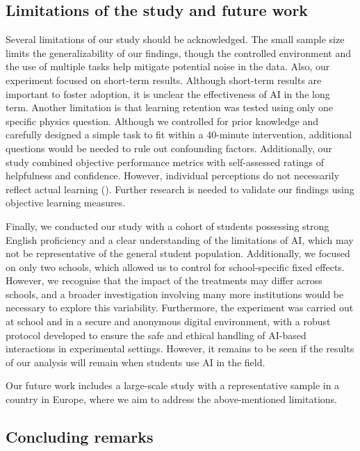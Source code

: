\documentclass[
  12pt,
]{article}
\begin{document}
\subsection{Limitations of the study and future work}\label{limitations-of-the-study-and-future-work}

Several limitations of our study should be acknowledged. The small sample size limits the generalizability of our findings, though the controlled environment and the use of multiple tasks help mitigate potential noise in the data. Also, our experiment focused on short-term results. Although short-term results are important to foster adoption, it is unclear the effectiveness of AI in the long term. Another limitation is that learning retention was tested using only one specific physics question. Although we controlled for prior knowledge and carefully designed a simple task to fit within a 40-minute intervention, additional questions would be needed to rule out confounding factors. Additionally, our study combined objective performance metrics with self-assessed ratings of helpfulness and confidence. However, individual perceptions do not necessarily reflect actual learning (). Further research is needed to validate our findings using objective learning measures.

Finally, we conducted our study with a cohort of students possessing strong English proficiency and a clear understanding of the limitations of AI, which may not be representative of the general student population. Additionally, we focused on only two schools, which allowed us to control for school-specific fixed effects. However, we recognise that the impact of the treatments may differ across schools, and a broader investigation involving many more institutions would be necessary to explore this variability. Furthermore, the experiment was carried out at school and in a secure and anonymous digital environment, with a robust protocol developed to ensure the safe and ethical handling of AI-based interactions in experimental settings. However, it remains to be seen if the results of our analysis will remain when students use AI in the field.

Our future work includes a large-scale study with a representative sample in a country in Europe, where we aim to address the above-mentioned limitations.

\subsection{Concluding remarks}\label{concluding-remarks}
\end{document}

